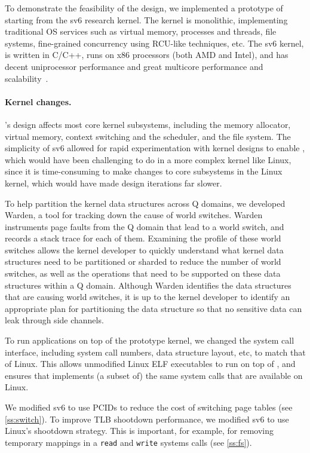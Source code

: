 To demonstrate the feasibility of the \sys design, we implemented a
prototype of \sys starting from the sv6 research kernel. The kernel
  is monolithic, implementing traditional OS services such as virtual
  memory, processes and threads, file systems, fine-grained
  concurrency using RCU-like techniques, etc.  The sv6 kernel, is
  written in C/C++, runs on x86 processors (both AMD and Intel), and
  has decent uniprocessor performance and great multicore performance
  and scalability~\cite{clements:sc}.

\paragraph{Kernel changes.}

\sys's design affects most core kernel subsystems, including the memory
allocator, virtual memory, context switching and the scheduler, and the
file system.  The simplicity of sv6 allowed for rapid experimentation
with kernel designs to enable \sys, which would have been challenging
to do in a more complex kernel like Linux, since it is time-consuming
to make changes to core subsystems in the Linux kernel, which would have made
design iterations far slower.

To help partition the kernel data structures across Q domains, we
developed Warden, a tool for tracking down the cause of world switches.
Warden instruments page faults from the Q domain that lead to a
world switch, and records a stack trace for each of them.  Examining the
profile of these world switches allows the kernel developer to quickly
understand what kernel data structures need to be partitioned or sharded
to reduce the number of world switches, as well as the operations
that need to be supported on these data structures within a Q domain.
Although Warden identifies the data structures that are causing world
switches, it is up to the kernel developer to identify an appropriate
plan for partitioning the data structure so that no sensitive data can
leak through side channels.

To run applications on top of the \sys prototype kernel, we changed the
\sys system call interface, including system call numbers, data structure
layout, etc, to match that of Linux.  This allows unmodified Linux
ELF executables to run on top of \sys, and ensures that \sys implements
(a subset of) the same system calls that are available on Linux.

We modified sv6 to use PCIDs to reduce the cost of switching page
tables (see \autoref{ss:switch}).  To improve TLB shootdown
performance, we modified sv6 to use Linux's shootdown strategy.  This
is important, for example, for removing temporary mappings in a
\texttt{read} and \texttt{write} systems calls (see \autoref{ss:fs}).

